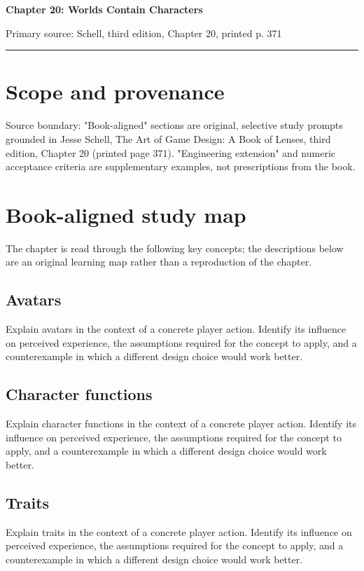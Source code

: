 \documentclass[11pt]{article}
\begin{document}
{\huge\bfseries\color{suiteblue} Chapter 20: Worlds Contain Characters}\par
\vspace{0.15in}
{\normalsize\color{suitegray} Primary source: Schell, third edition, Chapter 20, printed p. 371}\par
\vspace{0.15in}\hrule\vspace{0.15in}

\section{Scope and provenance}
Source boundary: "Book-aligned" sections are original, selective study prompts grounded in Jesse Schell, The Art of Game Design: A Book of Lenses, third edition, Chapter 20 (printed page 371). "Engineering extension" and numeric acceptance criteria are supplementary examples, not prescriptions from the book.


\section{Book-aligned study map}
The chapter is read through the following key concepts; the descriptions below are an original learning map rather than a reproduction of the chapter.


\subsection{Avatars}
Explain avatars in the context of a concrete player action. Identify its influence on perceived experience, the assumptions required for the concept to apply, and a counterexample in which a different design choice would work better.


\subsection{Character functions}
Explain character functions in the context of a concrete player action. Identify its influence on perceived experience, the assumptions required for the concept to apply, and a counterexample in which a different design choice would work better.


\subsection{Traits}
Explain traits in the context of a concrete player action. Identify its influence on perceived experience, the assumptions required for the concept to apply, and a counterexample in which a different design choice would work better.
\end{document}
